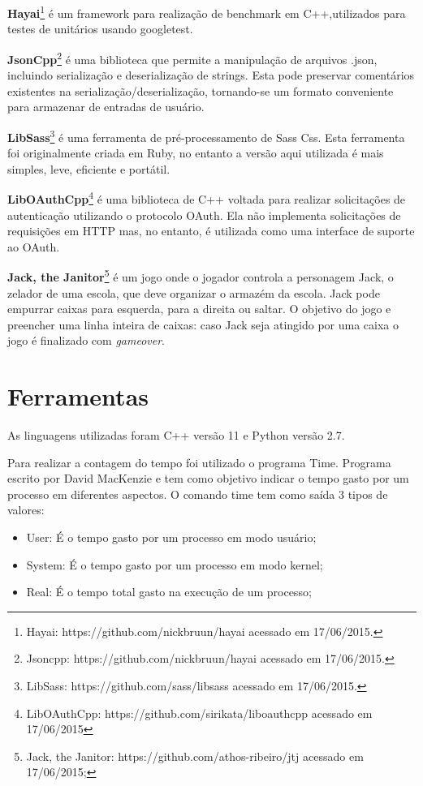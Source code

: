 \textbf{Hayai}\footnote{Hayai: https://github.com/nickbruun/hayai acessado em
 17/06/2015.} é um framework para realização de benchmark em C++,utilizados
 para testes de unitários usando googletest.

\textbf{JsonCpp}\footnote{Jsoncpp: https://github.com/nickbruun/hayai acessado
 em 17/06/2015. } é uma biblioteca que permite a manipulação de arquivos .json,
 incluindo serialização e deserialização de strings. Esta pode preservar
 comentários existentes na serialização/deserialização, tornando-se um formato
 conveniente para armazenar de entradas de usuário.

\textbf{LibSass}\footnote{LibSass: https://github.com/sass/libsass acessado
 em 17/06/2015.} é uma ferramenta de pré-processamento de Sass Css. Esta
 ferramenta foi originalmente criada em Ruby, no entanto a versão aqui utilizada
 é mais simples, leve, eficiente e portátil.

\textbf{LibOAuthCpp}\footnote{LibOAuthCpp: https://github.com/sirikata/liboauthcpp
 acessado em 17/06/2015} é uma biblioteca de C++ voltada para realizar solicitações
 de autenticação utilizando o protocolo OAuth. Ela não implementa solicitações de
 requisições em HTTP mas, no entanto, é utilizada como uma interface de suporte ao
 OAuth.

\textbf{Jack, the Janitor}\footnote{Jack, the Janitor: https://github.com/athos-ribeiro/jtj
 acessado em 17/06/2015;} é um jogo onde o jogador controla  a personagem Jack,
 o zelador de uma escola, que deve organizar o armazém da escola. Jack pode empurrar
 caixas para esquerda, para a direita ou saltar. O objetivo do jogo e preencher uma
 linha inteira de caixas: caso Jack seja atingido por uma caixa o jogo é finalizado
 com \textit{gameover}.

\section{Ferramentas}

As linguagens utilizadas foram C++ versão 11 e Python versão 2.7.

Para realizar a contagem do tempo foi utilizado o programa Time.
 Programa escrito por David MacKenzie e tem como objetivo indicar o tempo gasto
 por um processo em diferentes aspectos.
 O comando time tem como saída 3 tipos de valores:

\begin{itemize}
	\item User: É o tempo gasto por um processo em modo usuário;
	\item System:  É o tempo gasto por um processo em modo kernel;
	\item Real:  É o tempo total gasto na execução de um processo;
\end{itemize}

